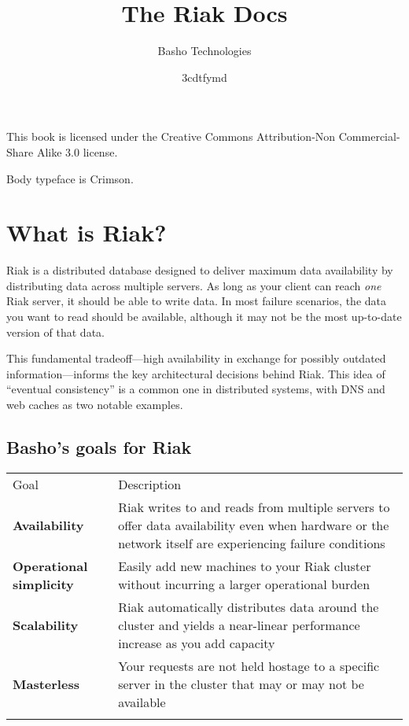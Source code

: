 \documentclass[letter]{book}
\title{The Riak Docs}
\author{Basho Technologies}
\title{\textbf{\savedtitle}}
\date{\w3cdtfymd}
\makeatletter
\let\savedauthor=\@author
\let\savedtitle=\@title
\renewcommand{\thefootnote}{\fnsymbol{footnote}}
\newcounter{tab}[chapter]
\makeatother
\begin{document}
\frontmatter
\maketitle
\vspace*{2.5in}
\begin{center}
    This book is licensed under the Creative Commons Attribution-Non Commercial-Share Alike 3.0 license.

    Body typeface is Crimson.
\end{center}
\setcounter{tocdepth}{4}
\tableofcontents\newpage\thispagestyle{empty}

\renewcommand{\thefootnote}{\arabic{footnote}}

\mainmatter
\fancyhf{}
\fancyhead[LE]{{\small\leftmark}}
\fancyhead[RO]{{\small\rightmark}}
\fancyhead[RE,LO]{{\small\savedauthor\hspace*{1ex}\textbf{\savedtitle}}}
\fancyfoot[LE,RO]{\small\textbf\thepage}
\pagestyle{fancy}

\section{What is Riak?}\label{what-is-riak}

Riak is a distributed database designed to deliver maximum data availability by distributing data across multiple servers. As long as your client can reach \emph{one} Riak server, it should be able to write data. In most failure scenarios, the data you want to read should be available, although it may not be the most up-to-date version of that data.

This fundamental tradeoff---high availability in exchange for possibly outdated information---informs the key architectural decisions behind Riak. This idea of “eventual consistency” is a common one in distributed systems, with DNS and web caches as two notable examples.

\subsection{Basho's goals for Riak}\label{bashos-goals-for-riak}

\begin{longtable}[c]{@{}ll@{}}
\toprule\addlinespace
Goal & Description
\\\addlinespace
\midrule\endhead
\textbf{Availability} & Riak writes to and reads from multiple servers to offer data availability even when hardware or the network itself are experiencing failure conditions
\\\addlinespace
\textbf{Operational simplicity} & Easily add new machines to your Riak cluster without incurring a larger operational burden
\\\addlinespace
\textbf{Scalability} & Riak automatically distributes data around the cluster and yields a near-linear performance increase as you add capacity
\\\addlinespace
\textbf{Masterless} & Your requests are not held hostage to a specific server in the cluster that may or may not be available
\\\addlinespace
\bottomrule
\end{longtable}
\end{document}
